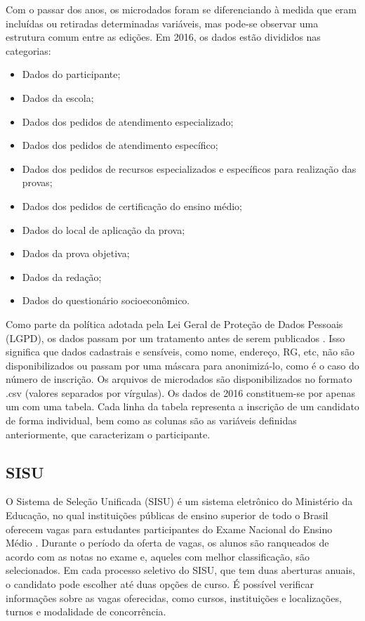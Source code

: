Com o passar dos anos, os microdados foram se diferenciando à medida que eram incluídas ou retiradas determinadas variáveis, mas pode-se observar uma estrutura comum entre as edições. Em 2016, os dados estão divididos nas categorias:

\begin{itemize}
  \item Dados do participante; 
  \item Dados da escola;
  \item Dados dos pedidos de atendimento especializado;
  \item Dados dos pedidos de atendimento específico;
  \item Dados dos pedidos de recursos especializados e específicos para realização das provas;
  \item Dados dos pedidos de certificação do ensino médio;
  \item Dados do local de aplicação da prova;
  \item Dados da prova objetiva;
  \item Dados da redação;
  \item Dados do questionário socioeconômico.
\end{itemize}

Como parte da política adotada pela Lei Geral de Proteção de Dados Pessoais (LGPD), os dados passam por um tratamento antes de serem publicados \autocite{inep:3}. Isso significa que dados cadastrais e sensíveis, como nome, endereço, RG, etc, não são disponibilizados ou passam por uma máscara para anonimizá-lo, como é o caso do número de inscrição. Os arquivos de microdados são disponibilizados no formato .csv (valores separados por vírgulas). Os dados de 2016 constituem-se por apenas um  com uma tabela. Cada linha da tabela representa a inscrição de um candidato de forma individual, bem como as colunas são as variáveis definidas anteriormente, que caracterizam o participante. 

\subsection{SISU}
O Sistema de Seleção Unificada (SISU) é um sistema eletrônico do Ministério da Educação, no qual instituições públicas de ensino superior de todo o Brasil oferecem vagas para estudantes participantes do Exame Nacional do Ensino Médio \autocite{mec:1}. Durante o período da oferta de vagas, os alunos são ranqueados de acordo com as notas no exame e, aqueles com melhor classificação, são selecionados. Em cada processo seletivo do SISU, que tem duas aberturas anuais, o candidato pode escolher até duas opções de curso. É possível verificar informações sobre as vagas oferecidas, como cursos, instituições e localizações, turnos e modalidade de concorrência.


